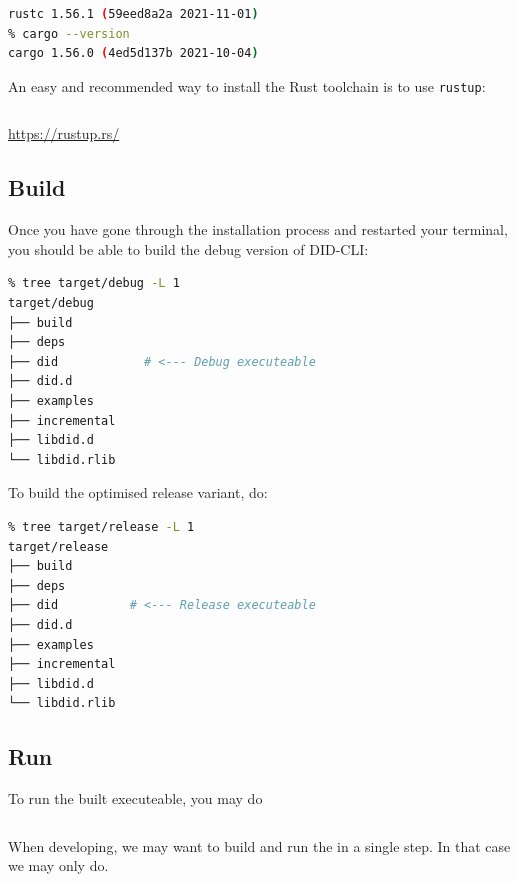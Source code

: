 \begin{lstlisting}[language=bash]
% rustc --version
rustc 1.56.1 (59eed8a2a 2021-11-01)
% cargo --version
cargo 1.56.0 (4ed5d137b 2021-10-04)
\end{lstlisting}

An easy and recommended way to install the Rust toolchain is to use
\passthrough{\lstinline!rustup!}:

\begin{lstlisting}[language=bash]
% curl --proto '=https' --tlsv1.2 -sSf https://sh.rustup.rs | sh
\end{lstlisting}

\url{https://rustup.rs/}

\hypertarget{build}{%
\subsection{Build}\label{build}}

Once you have gone through the installation process and restarted your
terminal, you should be able to build the debug version of DID-CLI:

\begin{lstlisting}[language=bash]
% cargo build
% tree target/debug -L 1  
target/debug
├── build
├── deps
├── did            # <--- Debug executeable
├── did.d
├── examples
├── incremental
├── libdid.d
└── libdid.rlib
\end{lstlisting}

To build the optimised release variant, do:

\begin{lstlisting}[language=bash]
% cargo build --release
% tree target/release -L 1
target/release
├── build
├── deps
├── did          # <--- Release executeable
├── did.d
├── examples
├── incremental
├── libdid.d
└── libdid.rlib
\end{lstlisting}

\hypertarget{run-1}{%
\subsection{Run}\label{run-1}}

To run the built executeable, you may do

\begin{lstlisting}[language=bash]
% ./target/debug/did
\end{lstlisting}

When developing, we may want to build and run the in a single step. In
that case we may only do.

